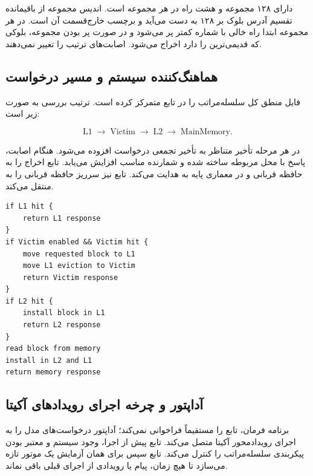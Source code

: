 \documentclass[oneside,a4paper,12pt]{article}
\newcommand{\مهم}[1]{\textbf{#1}}
\newcommand{\درصد}[1]{\lr{#1\%}}
\begin{document}
 دارای ۱۲۸ مجموعه و هشت راه در هر مجموعه است. اندیس مجموعه از باقیمانده تقسیم آدرس بلوک بر ۱۲۸ به دست می‌آید و برچسب خارج‌قسمت آن است. در هر مجموعه ابتدا راه خالی با شماره کمتر پر می‌شود و در صورت پر بودن مجموعه، بلوکی که قدیمی‌ترین  را دارد اخراج می‌شود. اصابت‌های  ترتیب  را تغییر نمی‌دهند.

\subsection{هماهنگ‌کننده سیستم و مسیر درخواست}

فایل  منطق کل سلسله‌مراتب را در تابع  متمرکز کرده است. ترتیب بررسی به صورت زیر است:

\begin{equation}
\mathrm{L1}\;\longrightarrow\;\mathrm{Victim}\;\longrightarrow\;\mathrm{L2}\;\longrightarrow\;\mathrm{MainMemory}.
\end{equation}

در هر مرحله تأخیر متناظر به تأخیر تجمعی درخواست افزوده می‌شود. هنگام اصابت، پاسخ با محل مربوطه ساخته شده و شمارنده مناسب افزایش می‌یابد. تابع  اخراج  را به حافظه قربانی و در معماری پایه به  هدایت می‌کند. تابع  نیز سرریز حافظه قربانی را به  منتقل می‌کند.

\begin{latin}
\begin{lstlisting}[caption={\lr{Simplified System.Access control path}}]
if L1 hit {
    return L1 response
}
if Victim enabled && Victim hit {
    move requested block to L1
    move L1 eviction to Victim
    return Victim response
}
if L2 hit {
    install block in L1
    return L2 response
}
read block from memory
install in L2 and L1
return memory response
\end{lstlisting}
\end{latin}

\subsection{آداپتور و چرخه اجرای رویدادهای آکیتا}

برنامه فرمان، تابع  را مستقیماً فراخوانی نمی‌کند؛ آداپتور درخواست‌های مدل را به اجرای رویدادمحور آکیتا متصل می‌کند. تابع  پیش از اجرا، وجود سیستم و معتبر بودن پیکربندی سلسله‌مراتب را کنترل می‌کند. تابع  سپس برای همان آزمایش یک موتور تازه می‌سازد تا هیچ زمان، پیام یا رویدادی از اجرای قبلی باقی نماند.
\end{document}
